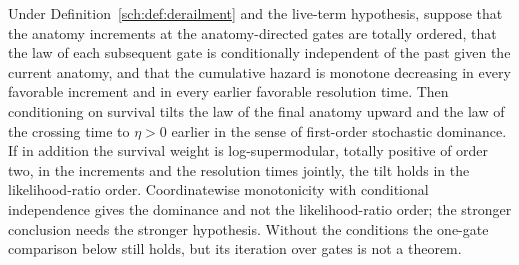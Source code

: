 \begin{proposition}\label{sch:prop:settlement}
Under Definition~\ref{sch:def:derailment} and the live-term
hypothesis, suppose that the anatomy increments at the anatomy-directed
gates are totally ordered, that the law of each subsequent gate is
conditionally independent of the past given the current anatomy, and
that the cumulative hazard is monotone decreasing in every favorable
increment and in every earlier favorable resolution time. Then
conditioning on survival tilts the law of the final anatomy upward and
the law of the crossing time to $\eta>0$ earlier in the sense of
first-order stochastic dominance. If in addition the survival weight
is log-supermodular, totally positive of order two, in the increments
and the resolution times jointly, the tilt holds in the
likelihood-ratio order. Coordinatewise monotonicity with conditional
independence gives the dominance and not the likelihood-ratio order;
the stronger conclusion needs the stronger hypothesis. Without the
conditions the one-gate comparison below still holds, but its
iteration over gates is not a theorem.
\end{proposition}

